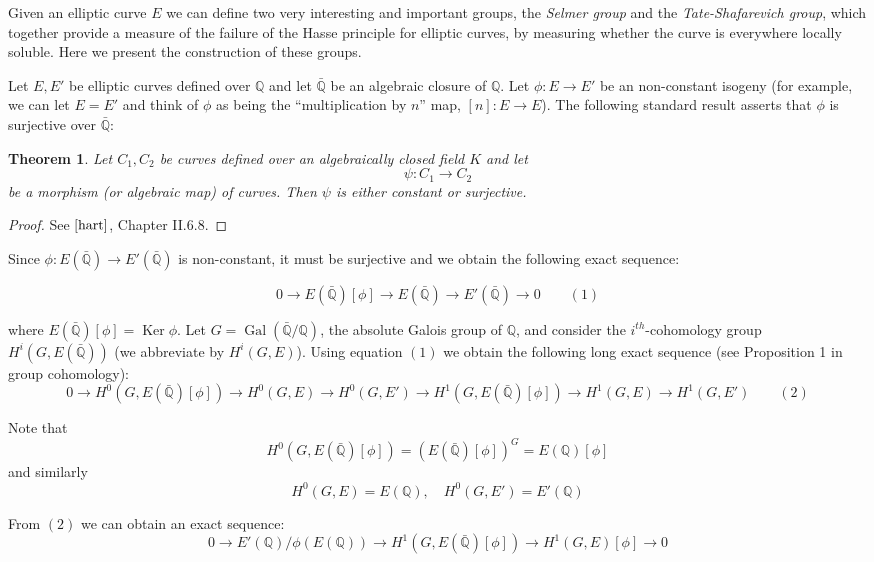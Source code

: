 \documentclass[12pt]{article}
\newtheorem{thm}{Theorem}
\begin{document}
Given an elliptic curve $E$ we can define two very interesting and
important groups, the \emph{Selmer group} and the
\emph{Tate-Shafarevich group}, which together provide a measure of
the failure of the Hasse principle for elliptic curves, by
measuring whether the curve is everywhere locally soluble. Here we
present the construction of these groups.

Let $E, E'$ be elliptic curves defined over $\mathbb{Q}$ and let
$\bar{\mathbb{Q}}$ be an algebraic closure of $\mathbb{Q}$. Let
$\phi\colon E \to E'$ be an non-constant isogeny (for example, we
can let $E=E'$ and think of $\phi$ as being the ``multiplication
by $n$'' map, $[n]\colon E\to E$). The following standard result
asserts that $\phi$ is surjective over $\bar{\mathbb{Q}}$:
\begin{thm}
Let $C_1,C_2$ be curves defined over an algebraically closed field
$K$ and let $$\psi \colon C_1 \to C_2$$ be a morphism (or
algebraic map) of curves. Then $\psi$ is either constant or
surjective.
\end{thm}
\begin{proof}
See $\cite{hart}$, Chapter II.6.8.
\end{proof}
Since $\phi \colon E(\bar{\mathbb{Q}})\to E'(\bar{\mathbb{Q}})$ is
non-constant, it must be surjective and we obtain the following
exact sequence: 

$$ 0\to E(\bar{\mathbb{Q}})[\phi]\to E(\bar{\mathbb{Q}})\to E'(\bar{\mathbb{Q}})\to 0 \quad\quad (1) $$

where $E(\bar{\mathbb{Q}})[\phi]=\operatorname{Ker}\phi$. Let
$G=\operatorname{Gal}({\bar{\mathbb{Q}}/\mathbb{Q}})$, the
absolute Galois group of $\mathbb{Q}$, and consider the
$i^{th}$-cohomology group $H^i(G,E(\bar{\mathbb{Q}}))$ (we
abbreviate by $H^i(G,E)$). Using equation $(1)$ we obtain the
following long exact sequence (see Proposition 1 in group
cohomology):
$$
0 \to H^0(G,E(\bar{\mathbb{Q}})[\phi]) \to
H^0(G,E)\to H^0(G,E') \to H^1(G,E(\bar{\mathbb{Q}})[\phi])\to H^1(G,E)\to
H^1(G,E') \quad\quad (2)$$

Note that
$$H^0(G,E(\bar{\mathbb{Q}})[\phi])={(E(\bar{\mathbb{Q}})[\phi])}^G=E(\mathbb{Q})[\phi]$$
and similarly
$$H^0(G,E)=E(\mathbb{Q}),\quad H^0(G,E')=E'(\mathbb{Q})$$

From $(2)$ we can obtain an exact sequence:
$$0\to E'(\mathbb{Q})/\phi(E(\mathbb{Q})) \to
H^1(G,E(\bar{\mathbb{Q}})[\phi]) \to H^1(G,E)[\phi]\to 0$$
\end{document}
